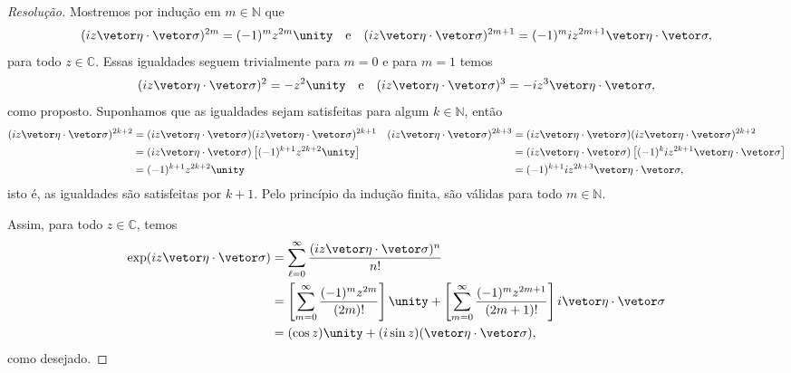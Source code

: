 \begin{proof}[Resolução]
    Mostremos por indução em \(m \in \mathbb{N}\) que
    \begin{equation*}
        (i{z}\vetor \eta \cdot \vetor \sigma)^{2m} = (-1)^m{z}^{2m}\unity\quad\text{e}\quad(i{z}\vetor \eta \cdot \vetor \sigma)^{2m+1} = (-1)^{m}i{z}^{2m+1}\vetor \eta \cdot \vetor \sigma,
    \end{equation*}
    para todo \({z} \in \mathbb{C}\). Essas igualdades seguem trivialmente para \(m = 0\) e para \(m = 1\) temos
    \begin{equation*}
        (i{z} \vetor \eta\cdot \vetor \sigma)^2 = - {z}^2 \unity\quad\text{e}\quad(i{z}\vetor\eta\cdot\vetor\sigma)^3 = -i{z}^3 \vetor \eta \cdot \vetor \sigma,
    \end{equation*}
    como proposto. Suponhamos que as igualdades sejam satisfeitas para algum \(k \in \mathbb{N}\), então
    \begin{align*}
        (i{z}\vetor \eta \cdot \vetor \sigma)^{2k+2} &= (i{z}\vetor \eta \cdot \vetor \sigma)(i{z}\vetor \eta \cdot \vetor \sigma)^{2k+1}&
        (i{z}\vetor \eta \cdot \vetor \sigma)^{2k+3} &= (i{z}\vetor \eta \cdot \vetor \sigma)(i{z}\vetor \eta \cdot \vetor \sigma)^{2k+2}\\
                                                     &= (i{z}\vetor \eta \cdot \vetor \sigma)\left[(-1)^{k+1}{z}^{2k+2} \unity\right]&
                                                    &= (i{z}\vetor \eta \cdot \vetor \sigma)\left[(-1)^ki{z}^{2k+1}\vetor \eta\cdot \vetor \sigma\right]\\
                                                    &= (-1)^{k+1}{z}^{2k+2} \unity&
                                                    &= (-1)^{k+1}i{z}^{2k+3}\vetor \eta \cdot \vetor \sigma,
    \end{align*}
    isto é, as igualdades são satisfeitas por \(k + 1\). Pelo princípio da indução finita, são válidas para todo \(m \in \mathbb{N}\).

    Assim, para todo \({z} \in \mathbb{C}\), temos
    \begin{align*}
        \exp(i{z} \vetor \eta \cdot \vetor \sigma) &= \sum_{\ell = 0}^{\infty} \frac{(i {z} \vetor \eta \cdot \vetor \sigma)^n}{n!}\\
                                                  &= \left[\sum_{m = 0}^{\infty} \frac{(-1)^{m}{z}^{2m}}{(2m)!}\right] \unity + \left[\sum_{m=0}^\infty\frac{(-1)^m {z}^{2m+1}}{(2m+1)!}\right] i \vetor \eta \cdot \vetor \sigma\\
                                                  &= (\cos{z})\unity + (i\sin{z})(\vetor \eta \cdot \vetor \sigma),
    \end{align*}
    como desejado.
\end{proof}
